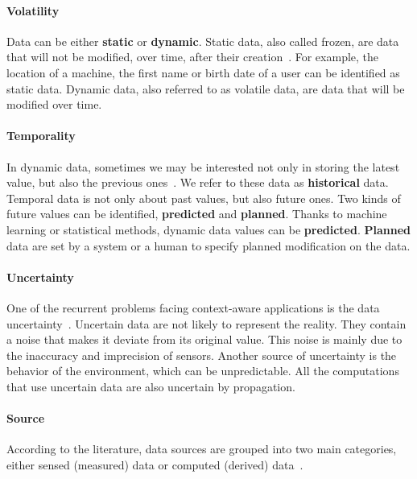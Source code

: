 \paragraph{Volatility}
Data can be either \textbf{static} or \textbf{dynamic}.
Static data, also called frozen, are data that will not be modified, over time, after their creation~\cite{DBLP:conf/pervasive/HenricksenIR02, DBLP:journals/comsur/MakrisSS13, bettini2010survey, chong2007context}.
For example, the location of a machine, the first name or birth date of a user can be identified as static data. 
Dynamic data, also referred to as volatile data, are data that will be modified over time.

\paragraph{Temporality}
In dynamic data, sometimes we may be interested not only in storing the latest value, but also the previous ones~\cite{DBLP:conf/seke/0001FNMKT14, DBLP:conf/pervasive/HenricksenIR02, chong2007context}. 
We refer to these data as \textbf{historical} data.
Temporal data is not only about past values, but also future ones. 
Two kinds of future values can be identified, \textbf{predicted} and \textbf{planned}.  
Thanks to machine learning or statistical methods, dynamic data values can be \textbf{predicted}. 
\textbf{Planned} data are set by a system or a human to specify planned modification on the data.

\paragraph{Uncertainty}
One of the recurrent problems facing context-aware applications is the data uncertainty~\cite{DBLP:conf/dagstuhl/LemosGMSALSTVVWBBBBCDDEGGGGIKKLMMMMMNPPSSSSTWW10, DBLP:conf/pervasive/HenricksenIR02, DBLP:journals/comsur/MakrisSS13, bettini2010survey}.
Uncertain data are not likely to represent the reality. They contain a noise that makes it deviate from its original value.
This noise is mainly due to the inaccuracy and imprecision of sensors.
Another source of uncertainty is the behavior of the environment, which can be unpredictable.
All the computations that use uncertain data are also uncertain by propagation.

\paragraph{Source}
According to the literature, data sources are grouped into two main categories, either sensed (measured) data or computed (derived) data~\cite{DBLP:journals/comsur/PereraZCG14, chong2007context}.


